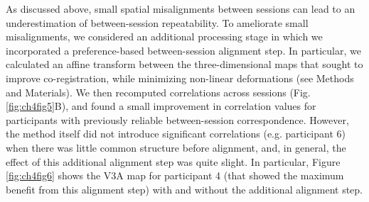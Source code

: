 As discussed above, small spatial misalignments between sessions can lead to an underestimation of between-session repeatability. To ameliorate small misalignments, we considered an additional processing stage in which we incorporated a preference-based between-session alignment step. In particular, we calculated an affine transform between the three-dimensional maps that sought to improve co-registration, while minimizing non-linear deformations (see Methods and Materials). We then recomputed correlations across sessions (Fig. \ref{fig:ch4fig5}B), and found a small improvement in correlation values for participants with previously reliable between-session correspondence. However, the method itself did not introduce significant correlations (e.g. participant 6) when there was little common structure before alignment, and, in general, the effect of this additional alignment step was quite slight. In particular, Figure \ref{fig:ch4fig6} shows the V3A map for participant 4 (that showed the maximum benefit from this alignment step) with and without the additional alignment step. 

